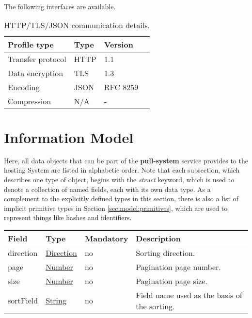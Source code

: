 \documentclass[a4paper]{arrowhead}
\newcommand{\pref}[1]{{\textcolor{ArrowheadGrey}{\hyperref[sec:model:primitives:#1]{#1}}}}
\begin{document}
The following interfaces are available.


\begin{table}[ht!]
  \centering
  \begin{tabular}{|l|l|l|l|}
    \rowcolor{gray!33} Profile type & Type & Version \\ \hline
    Transfer protocol & HTTP & 1.1 \\ \hline
    Data encryption & TLS & 1.3 \\ \hline
    Encoding & JSON & RFC 8259 \cite{rfc8259} \\ \hline
    Compression & N/A & - \\ \hline
  \end{tabular}
  \caption{HTTP/TLS/JSON communication details.}
  \label{tab:comunication_semantics_profile}
\end{table}

\clearpage

\section{Information Model}
\label{sec:model}

Here, all data objects that can be part of the \textbf{pull-system} service
provides to the hosting System are listed in alphabetic order.
Note that each subsection, which describes one type of object, begins with the \textit{struct} keyword, which is used to denote a collection of named fields, each with its own data type.
As a complement to the explicitly defined types in this section, there is also a list of implicit primitive types in Section \ref{sec:model:primitives}, which are used to represent things like hashes and identifiers.

\label{sec:model:QueryParams}

\begin{table}[ht!]
\begin{tabularx}{\textwidth}{| p{3cm} | p{3cm} | p{2cm} | X |} \hline
\rowcolor{gray!33} Field & Type & Mandatory & Description \\ \hline
direction & \pref{Direction} & no & Sorting direction. \\ \hline
page & \pref{Number} & no & Pagination page number. \\ \hline
size & \pref{Number} & no & Pagination page size. \\ \hline
sortField &\pref{String} & no & Field name used as the basis of the sorting. \\ \hline
\end{tabularx}
\end{table}
\end{document}
